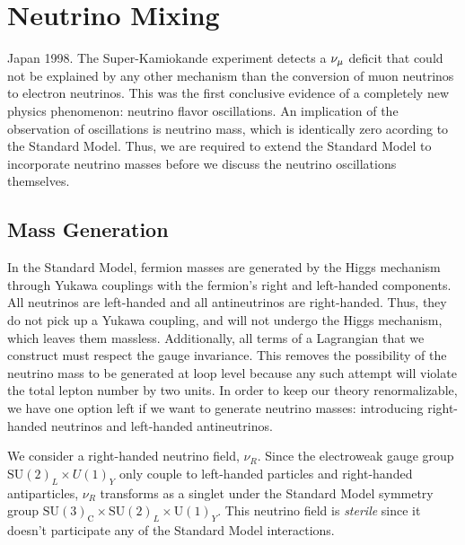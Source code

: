 % 
% 

\section{Neutrino Mixing}\label{ch:oscillation}
Japan 1998. The Super-Kamiokande experiment detects a $\nu_\mu$ deficit that could not be explained by any other mechanism
than the conversion of muon neutrinos to electron neutrinos. This was the first conclusive evidence of a completely new physics phenomenon: neutrino flavor
oscillations. An implication of the observation of oscillations is neutrino mass, 
which is identically zero acording to the Standard Model. Thus, we are required to extend the Standard Model to incorporate neutrino 
masses before we discuss the neutrino oscillations themselves.

\subsection{Mass Generation}
In the Standard Model, fermion masses are generated by the Higgs mechanism through Yukawa couplings with the fermion's right and left-handed components.
All neutrinos are left-handed and all antineutrinos are right-handed. Thus, they do not pick up a Yukawa coupling, 
and will not undergo the Higgs mechanism, which leaves them massless.
Additionally, all terms of a Lagrangian that we construct must respect the gauge invariance. This removes the possibility of the neutrino mass to be 
generated at loop level because any such attempt will violate the total lepton number by two units.
In order to keep our theory renormalizable, we have one option left if we want to generate neutrino masses: introducing right-handed neutrinos and left-handed antineutrinos. 

We consider a right-handed neutrino field, $\nu_R$. Since the electroweak gauge group $\text{SU}(2)_L \times U(1)_Y$ only couple to 
left-handed particles and right-handed antiparticles, $\nu_R$ transforms as a singlet under the Standard Model symmetry 
group $\mathrm{SU}(3)_{\mathrm{C}} \times \mathrm{SU}(2)_{L} \times \mathrm{U}(1)_{Y}$. 
This neutrino field is \emph{sterile} since it doesn't participate any of the Standard Model interactions. 

